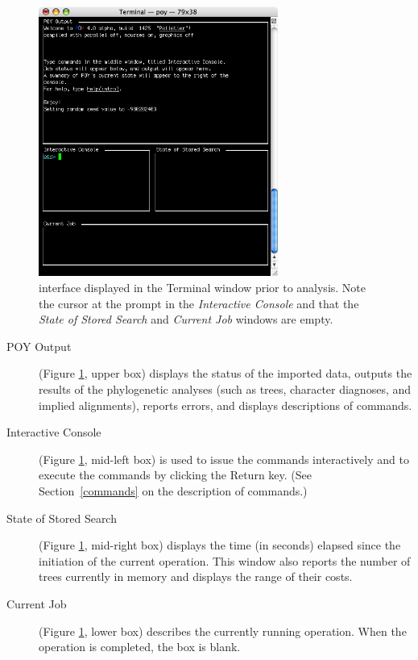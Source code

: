 \begin{figure}[htbp]
   \centering
   \includegraphics[width=0.7\textwidth]{doc/figures/figinterface.jpg}
   \caption{\poy interface displayed in the Terminal window prior to analysis. Note the cursor at the \poy prompt in the \emph{Interactive Console} and that the \emph{State of Stored Search} and \emph{Current Job} windows are empty.}
   \label{fig:figinterface}
\end{figure}

\begin{description}
\item[POY Output] (Figure \ref{fig:figinterface}, upper box) displays the status of the imported data, outputs the results of the phylogenetic analyses (such as trees, character diagnoses, and implied alignments), reports errors, and displays descriptions of \poy commands.
\item[Interactive Console] (Figure \ref{fig:figinterface}, mid-left box) is used to issue the commands interactively and to execute the commands by clicking the Return key. (See Section~\ref{commands} on the description of \poy commands.)
\item[State of Stored Search] (Figure \ref{fig:figinterface}, mid-right box) displays the time (in seconds) elapsed since the initiation of the current operation. This window also reports the number of trees currently in memory and displays the range of their costs.
\item[Current Job] (Figure \ref{fig:figinterface}, lower box) describes the currently running operation. When the operation is completed, the box is blank.
\end{description} 


